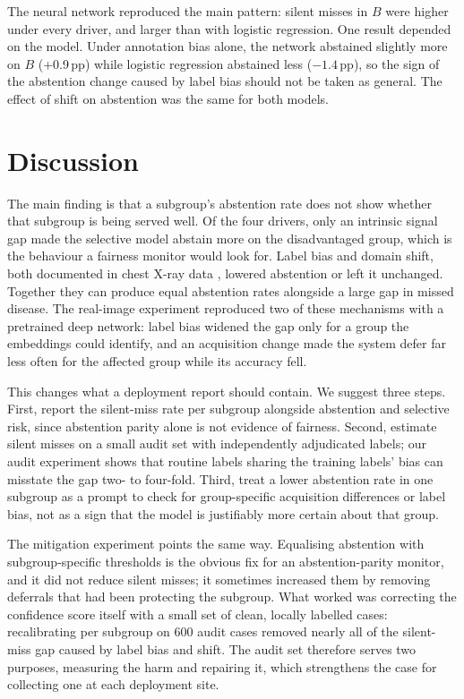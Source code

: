\documentclass[conference]{IEEEtran}
\newcommand{\pp}{\,pp}
\begin{document}
The neural network reproduced the main pattern: silent misses in $B$ were higher under every driver, and larger than with logistic regression. One result depended on the model. Under annotation bias alone, the network abstained slightly more on $B$ (+0.9\pp) while logistic regression abstained less ($-1.4$\pp), so the sign of the abstention change caused by label bias should not be taken as general. The effect of shift on abstention was the same for both models.





\section{Discussion}

The main finding is that a subgroup's abstention rate does not show whether that subgroup is being served well. Of the four drivers, only an intrinsic signal gap made the selective model abstain more on the disadvantaged group, which is the behaviour a fairness monitor would look for. Label bias and domain shift, both documented in chest X-ray data \cite{seyyedkalantari2021,zech2018}, lowered abstention or left it unchanged. Together they can produce equal abstention rates alongside a large gap in missed disease. The real-image experiment reproduced two of these mechanisms with a pretrained deep network: label bias widened the gap only for a group the embeddings could identify, and an acquisition change made the system defer far less often for the affected group while its accuracy fell.

This changes what a deployment report should contain. We suggest three steps. First, report the silent-miss rate per subgroup alongside abstention and selective risk, since abstention parity alone is not evidence of fairness. Second, estimate silent misses on a small audit set with independently adjudicated labels; our audit experiment shows that routine labels sharing the training labels' bias can misstate the gap two- to four-fold. Third, treat a lower abstention rate in one subgroup as a prompt to check for group-specific acquisition differences or label bias, not as a sign that the model is justifiably more certain about that group.



The mitigation experiment points the same way. Equalising abstention with subgroup-specific thresholds is the obvious fix for an abstention-parity monitor, and it did not reduce silent misses; it sometimes increased them by removing deferrals that had been protecting the subgroup. What worked was correcting the confidence score itself with a small set of clean, locally labelled cases: recalibrating per subgroup on 600 audit cases removed nearly all of the silent-miss gap caused by label bias and shift. The audit set therefore serves two purposes, measuring the harm and repairing it, which strengthens the case for collecting one at each deployment site.
\end{document}
